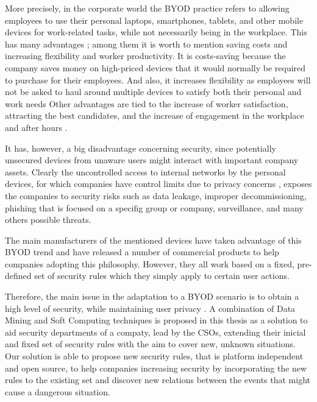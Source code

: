 More precisely, in the corporate world the BYOD practice refers to allowing employees to use their personal laptops, smartphones, tablets, and other mobile devices for work-related tasks, while not necessarily being in the workplace. This has many advantages \cite{singh2012byod}; among them it is worth to mention saving costs and increasing flexibility and worker productivity. It is costs-saving because the company saves money on high-priced devices that it would normally be required to purchase for their employees. And also, it increases flexibility  as employees will not be asked to haul around multiple devices to satisfy both their personal and work needs %
Other advantages are tied to the increase of worker satisfaction, attracting the best candidates, and the increase of engagement in the workplace and after hours \cite{singh2012byod}.

It has, however, a big disadvantage concerning security, since potentially unsecured devices from unaware users might interact with important company assets. Clearly the uncontrolled access to internal networks by the personal devices, for which companies have control limits due to privacy concerns \cite{miller2012byod}, exposes the companies to security risks such as data leakage, improper decommissioning, phishing that is focused on a specifig group or company, surveillance, and many others possible threats\cite{lennon2012changing}.

The main manufacturers of the mentioned devices have taken advantage of this BYOD trend and have released a number of commercial products to help companies adopting this philosophy. However, they all work based on a fixed, pre-defined set of security rules which they simply apply to certain user actions.

Therefore, the main issue in the adaptation to a BYOD scenario is to obtain a high level of security, while maintaining user privacy \cite{miller2012byod}. A combination of Data Mining and Soft Computing techniques is proposed in this thesis as a solution to aid security departments of a compaty, lead by the CSOs, extending their inicial and fixed set of security rules with the aim to cover new, unknown situations.
Our solution is able to propose new security rules, that is platform independent and open source, to help companies increasing security by incorporating the new rules to the existing set and discover new relations between the events that might cause a dangerous situation.

